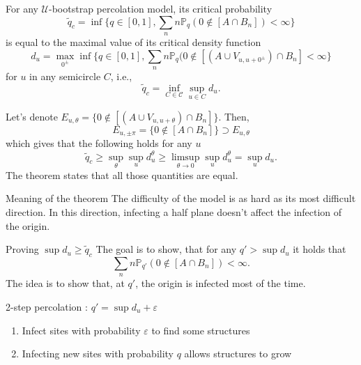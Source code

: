 \documentclass{beamer}
\begin{document}
\begin{frame}
	\begin{theorem}
		For any $\mathcal{U}$-bootstrap percolation model, its critical probability
		\begin{equation*}
			\tilde q_c = \inf\{q\in[0,1], \sum_n n\mathbb{P}_q(0\not\in [A\cap B_n]) < \infty\}
		\end{equation*}
		is equal to the maximal value of its critical density function
		\begin{equation*}
			d_u = \max_{0^\pm} \inf\{q\in[0,1], \sum_n n\mathbb{P}_q(0\not\in[(A\cup V_{u, u + 0^\pm})\cap B_n] < \infty\}
		\end{equation*}
		for $u$ in any semicircle $C$, i.e.,
		\begin{equation*}
			\tilde q_c = \inf_{C\in \mathcal{C}} \sup_{u\in C} d_u.
		\end{equation*}

	\end{theorem}
\end{frame}

\begin{frame}
	Let's denote $E_{u, \theta} = \{0\not\in [(A\cup V_{u, u+\theta})\cap B_n]\}$. Then,
	\begin{equation*}
		E_{u, \pm\pi} = \{ 0 \not\in [A\cap B_n]\} \supset E_{u, \theta}
	\end{equation*}
	which gives that the following holds for any $u$
	\begin{equation*}
		\tilde q_c \geq \sup_\theta \sup_u d_u^\theta \geq \limsup_{\theta\to 0} \sup_u d_u^\theta = \sup_u d_u.
	\end{equation*}
	The theorem states that all those quantities are equal. 
	\begin{block}{Meaning of the theorem}
		The difficulty of the model is as hard as its most difficult direction. In this direction, infecting a half plane doesn't affect the infection of the origin.
	\end{block}
\end{frame}

\begin{frame}{Proving $\sup d_u \geq \tilde q_c$}
	The goal is to show, that for any $q'>\sup d_u$ it holds that
	\begin{equation*}
		\sum_n n \mathbb{P}_{q'}(0\not\in[A\cap B_n]) < \infty.
	\end{equation*}
	The idea is to show that, at $q'$, the origin is infected most of the time.
	\begin{block}{2-step percolation : $q' = \sup d_u + \varepsilon$}
		\begin{enumerate}
			\item Infect sites with probability $\varepsilon$ to find some structures
			\item Infecting new sites with probability $q$ allows structures to grow
		\end{enumerate}
	\end{block}
\end{frame}
\end{document}
